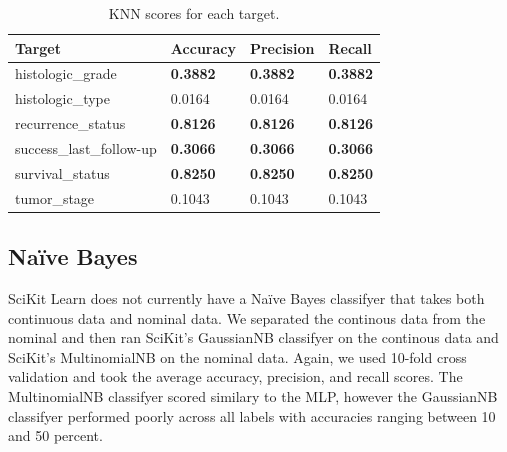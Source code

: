\documentclass{article}
\begin{document}
\medskip
\begin{table}[H]
\begin{center}
\begin{tabular}{ *{4}{l} }
    \multicolumn{1}{p{1.5cm}}{\raggedright Target} &  
    \multicolumn{1}{p{1.5cm}}{\raggedright Accuracy} &  
    \multicolumn{1}{p{1.5cm}}{\raggedright Precision} &  
    \multicolumn{1}{p{1.5cm}}{\raggedright Recall} \\ \hline
histologic\_grade         &              \textbf{0.3882} &               \textbf{0.3882} &            \textbf{0.3882} \\
histologic\_type          &              0.0164 &               0.0164 &            0.0164 \\
recurrence\_status        &              \textbf{0.8126} &               \textbf{0.8126} &            \textbf{0.8126} \\
success\_last\_follow-up  &              \textbf{0.3066} &               \textbf{0.3066} &            \textbf{0.3066} \\
survival\_status          &              \textbf{0.8250} &               \textbf{0.8250} &            \textbf{0.8250} \\
tumor\_stage              &              0.1043 &               0.1043 &            0.1043 \\
\end{tabular}
\caption{KNN scores for each target.}
\end{center}
\end{table}

\subsection{Naïve Bayes}
SciKit Learn does not currently have a Naïve Bayes classifyer that takes both continuous data and nominal data. We separated the continous data from the nominal and then ran SciKit's GaussianNB classifyer on the continous data and SciKit's MultinomialNB on the nominal data. Again, we used 10-fold cross validation and took the average accuracy, precision, and recall scores. The MultinomialNB classifyer scored similary to the MLP, however the GaussianNB classifyer performed poorly across all labels with accuracies ranging between 10 and 50 percent.
\end{document}
